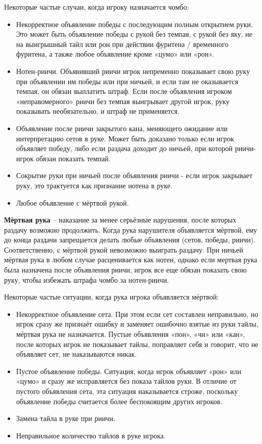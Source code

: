 Некоторые частые случаи, когда игроку назначается чомбо:
\begin{itemize}
	\item Некорректное объявление победы с последующим полным открытием руки. Это может быть объявление победы с рукой без темпая, с рукой без яку, не на выигрышный тайл или рон при действии фуритена / временного фуритена, а также любое объявление кроме «цумо» или «рон».
	\item Нотен-риичи. Объявивший риичи игрок непременно показывает свою руку при объявлении им победы или при ничьей, и если там не оказывается темпая, он обязан выплатить штраф. Если после объявления игроком «неправомерного» риичи без темпая выигрывает другой игрок, руку показывать необязательно, и штраф не применяется.
	\item Объявление после риичи закрытого кана, меняющего ожидание или интерпретацию сетов в руке. Может быть доказано только если игрок объявляет победу, либо если раздача доходит до ничьей, при которой риичи-игрок обязан показать темпай.
	\item Сокрытие руки при ничьей после объявления риичи - если игрок закрывает руку, это трактуется как признание нотена в руке.
	\item Любое объявление с мёртвой рукой.
\end{itemize}

\textbf{Мёртвая рука} – наказание за менее серьёзные нарушения, после которых раздачу возможно продолжить. Когда рука нарушителя объявляется мёртвой, ему до конца раздачи запрещается делать любые объявления (сетов, победы, риичи). Соответственно, с мёртвой рукой невозможно выиграть раздачу. При ничьей мёртвая рука в любом случае расценивается как нотен, однако если мертвая рука была назначена после объявления риичи, игрок все еще обязан показать свою руку, чтобы избежать штрафа чомбо за нотен-риичи.

Некоторые частые ситуации, когда рука игрока объявляется мёртвой:
\begin{itemize}
	\item Некорректное объявление сета. При этом если сет составлен неправильно, но игрок сразу же признаёт ошибку и заменяет ошибочно взятые из руки тайлы, мёртвая рука не назначается. Пустые объявления «пон», «чи» или «кан», после которых игрок не показывает тайлы, поправляет себя и говорит, что не объявляет сет, не наказываются никак.
	\item Пустое объявление победы. Ситуация, когда игрок объявляет «рон» или «цумо» и сразу же исправляется без показа тайлов руки. В отличие от пустого объявления сета, эта ситуация наказывается строже, поскольку объявление победы считается более беспокоящим других игроков.
	\item Замена тайла в руке при риичи.
	\item Неправильное количество тайлов в руке игрока.
\end{itemize}


